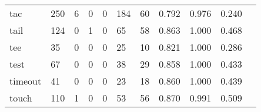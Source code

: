 \begin{longtable}{lp{1.2cm}p{1.2cm}p{1.2cm}p{1.2cm}p{1.2cm}p{1.2cm}p{1.2cm}p{1.2cm}p{1.2cm}p{1.2cm}}
tac       &                                   250 &                                                  6 &                                                  0 &                                                  0 &                                                184 &                                                 60 &                                              0.792 &                                              0.976 &                                              0.240 \\
tail      &                                   124 &                                                  0 &                                                  1 &                                                  0 &                                                 65 &                                                 58 &                                              0.863 &                                              1.000 &                                              0.468 \\
tee       &                                    35 &                                                  0 &                                                  0 &                                                  0 &                                                 25 &                                                 10 &                                              0.821 &                                              1.000 &                                              0.286 \\
test      &                                    67 &                                                  0 &                                                  0 &                                                  0 &                                                 38 &                                                 29 &                                              0.858 &                                              1.000 &                                              0.433 \\
timeout   &                                    41 &                                                  0 &                                                  0 &                                                  0 &                                                 23 &                                                 18 &                                              0.860 &                                              1.000 &                                              0.439 \\
touch     &                                   110 &                                                  1 &                                                  0 &                                                  0 &                                                 53 &                                                 56 &                                              0.870 &                                              0.991 &                                              0.509 \\

\end{longtable}
